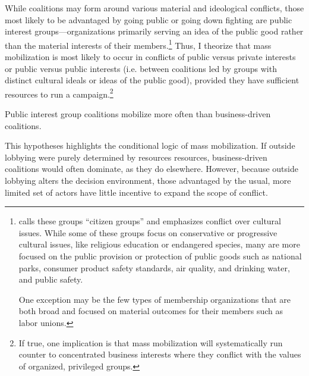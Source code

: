 \begin{subhyp}
While coalitions may form around various material and ideological conflicts, those most likely to be advantaged by going public or going down fighting are public interest groups---organizations primarily serving an idea of the public good rather than the material interests of their members.\footnote{\citet{Berry1999} calls these groups ``citizen groups'' and emphasizes conflict over cultural issues. While some of these groups focus on conservative or progressive cultural issues, like religious education or endangered species, many are more focused on the public provision or protection of public goods such as national parks, consumer product safety standards, air quality, and drinking water, and public safety.

One exception may be the few types of membership organizations that are both broad and focused on material outcomes for their members such as labor unions.} Thus, I theorize that mass mobilization is most likely to occur in conflicts of public versus private interests or public versus public interests (i.e. between coalitions led by groups with distinct cultural ideals or ideas of the public good), provided they have sufficient resources to run a campaign.\footnote{
If true, one implication is that mass mobilization will systematically run counter to concentrated business interests where they conflict with the values of organized, privileged groups.
}

\begin{hyp}
Public interest group coalitions mobilize more often than business-driven coalitions.
\end{hyp}

This hypotheses highlights the conditional logic of mass mobilization. If outside lobbying were purely determined by resources resources, business-driven coalitions would often dominate, as they do elsewhere. However, because outside lobbying alters the decision environment, those advantaged by the usual, more limited set of actors have little incentive to expand the scope of conflict.







\end{subhyp}
